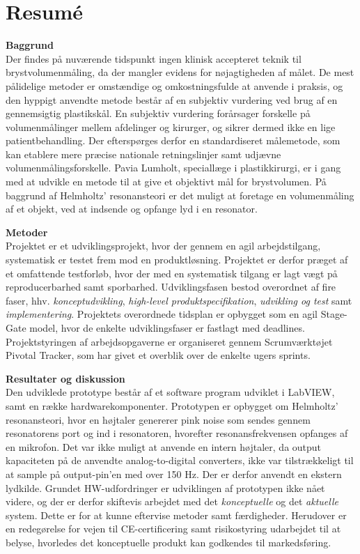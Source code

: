 \section{Resumé}

\textbf{Baggrund} \\
Der findes på nuværende tidspunkt ingen klinisk accepteret teknik til brystvolumenmåling, da der mangler evidens for nøjagtigheden af målet. De mest pålidelige metoder er omstændige og omkostningsfulde at anvende i praksis, og den hyppigt anvendte metode består af en subjektiv vurdering ved brug af en gennemsigtig plastikskål. En subjektiv vurdering forårsager forskelle på volumenmålinger mellem afdelinger og kirurger, og sikrer dermed ikke en lige patientbehandling. Der efterspørges derfor en standardiseret målemetode, som kan etablere mere præcise nationale retningslinjer samt udjævne volumenmålingsforskelle. Pavia Lumholt, speciallæge i plastikkirurgi, er i gang med at udvikle en metode til at give et objektivt mål for brystvolumen. På baggrund af Helmholtz' resonansteori er det muligt at foretage en volumenmåling af et objekt, ved at indsende og opfange lyd i en resonator.   

\textbf{Metoder} \\
Projektet er et udviklingsprojekt, hvor der gennem en agil arbejdstilgang, systematisk er testet frem mod en produktløsning. Projektet er derfor præget af et omfattende testforløb, hvor der med en systematisk tilgang er lagt vægt på reproducerbarhed samt sporbarhed. 
Udviklingsfasen bestod overordnet af fire faser, hhv. \textit{konceptudvikling}, \textit{high-level produktspecifikation}, \textit{udvikling og test} samt \textit{implementering}.
Projektets overordnede tidsplan er opbygget som en agil Stage- Gate model, hvor de enkelte udviklingsfaser er fastlagt med deadlines. Projektstyringen af arbejdsopgaverne er organiseret gennem Scrumværktøjet Pivotal Tracker, som har givet et overblik over de enkelte ugers sprints.

\textbf{Resultater og diskussion}\\
Den udviklede prototype består af et software program
udviklet i LabVIEW, samt en række hardwarekomponenter. Prototypen er opbygget om Helmholtz' resonansteori, hvor en højtaler genererer pink noise som sendes gennem resonatorens port og ind i resonatoren, hvorefter resonansfrekvensen opfanges af en mikrofon. Det var ikke muligt at anvende en intern højtaler, da output kapaciteten på de anvendte analog-to-digital converters, ikke var tilstrækkeligt til at sample på output-pin'en med over 150 Hz. Der er derfor anvendt en ekstern lydkilde. Grundet HW-udfordringer er udviklingen af prototypen ikke nået videre, og der er derfor skiftevis arbejdet med det \textit{konceptuelle} og det \textit{aktuelle} system. Dette er for at kunne eftervise metoder samt færdigheder. 
Herudover er en redegørelse for vejen til CE-certificering samt risikostyring udarbejdet til at belyse, hvorledes det konceptuelle produkt kan godkendes til markedsføring.
 
